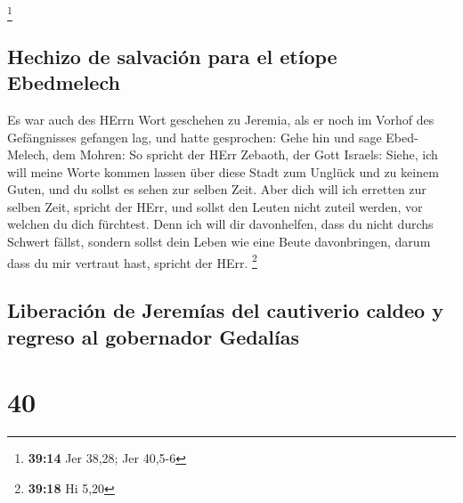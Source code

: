 \footnote{\textbf{39:14} Jer 38,28; Jer 40,5-6}

\hypertarget{hechizo-de-salvaciuxf3n-para-el-etuxedope-ebedmelech}{%
\subsection{Hechizo de salvación para el etíope
Ebedmelech}\label{hechizo-de-salvaciuxf3n-para-el-etuxedope-ebedmelech}}

 Es war auch des HErrn Wort geschehen zu Jeremia, als er
noch im Vorhof des Gefängnisses gefangen lag, und hatte gesprochen:
 Gehe hin und sage Ebed-Melech, dem Mohren: So spricht
der HErr Zebaoth, der Gott Israels: Siehe, ich will meine Worte kommen
lassen über diese Stadt zum Unglück und zu keinem Guten, und du sollst
es sehen zur selben Zeit.  Aber dich will ich erretten
zur selben Zeit, spricht der HErr, und sollst den Leuten nicht zuteil
werden, vor welchen du dich fürchtest.  Denn ich will dir
davonhelfen, dass du nicht durchs Schwert fällst, sondern sollst dein
Leben wie eine Beute davonbringen, darum dass du mir vertraut hast,
spricht der HErr. \footnote{\textbf{39:18} Hi 5,20}

\hypertarget{liberaciuxf3n-de-jeremuxedas-del-cautiverio-caldeo-y-regreso-al-gobernador-gedaluxedas}{%
\subsection{Liberación de Jeremías del cautiverio caldeo y regreso al
gobernador
Gedalías}\label{liberaciuxf3n-de-jeremuxedas-del-cautiverio-caldeo-y-regreso-al-gobernador-gedaluxedas}}

\hypertarget{section-39}{%
\section{40}\label{section-39}}


